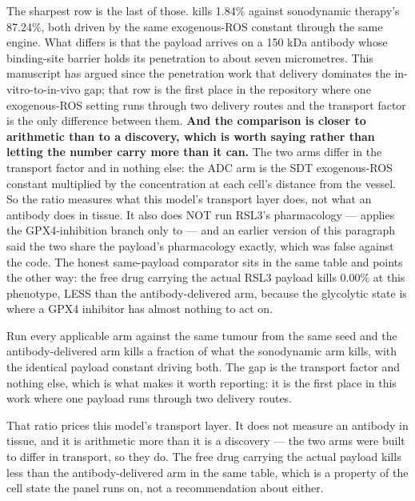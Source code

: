\documentclass[11pt,twoside,openright]{report}
\begin{document}
The sharpest row is the last of those.  kills 1.84\% against sonodynamic therapy's 87.24\%, both driven by the same exogenous-ROS constant through the same engine. What differs is that the payload arrives on a 150 kDa antibody whose binding-site barrier holds its penetration to about seven micrometres. This manuscript has argued since the penetration work that delivery dominates the in-vitro-to-in-vivo gap; that row is the first place in the repository where one exogenous-ROS setting runs through two delivery routes and the transport factor is the only difference between them. \textbf{And the comparison is closer to arithmetic than to a discovery, which is worth saying rather than letting the number carry more than it can.} The two arms differ in the transport factor and in nothing else: the ADC arm is the SDT exogenous-ROS constant multiplied by the concentration at each cell's distance from the vessel. So the ratio measures what this model's transport layer does, not what an antibody does in tissue. It also does NOT run RSL3's pharmacology ---  applies the GPX4-inhibition branch only to  --- and an earlier version of this paragraph said the two share the payload's pharmacology exactly, which was false against the code. The honest same-payload comparator sits in the same table and points the other way: the free drug carrying the actual RSL3 payload kills 0.00\% at this phenotype, LESS than the antibody-delivered arm, because the glycolytic state is where a GPX4 inhibitor has almost nothing to act on.

\begin{finding}
Run every applicable arm against the same tumour from the same seed and the antibody-delivered arm kills a fraction of what the sonodynamic arm kills, with the identical payload constant driving both. The gap is the transport factor and nothing else, which is what makes it worth reporting: it is the first place in this work where one payload runs through two delivery routes.
\end{finding}

\begin{refusal}
That ratio prices this model's transport layer. It does not measure an antibody in tissue, and it is arithmetic more than it is a discovery --- the two arms were built to differ in transport, so they do. The free drug carrying the actual payload kills less than the antibody-delivered arm in the same table, which is a property of the cell state the panel runs on, not a recommendation about either.
\end{refusal}
\end{document}
